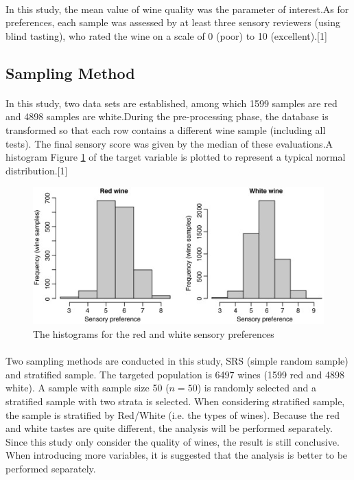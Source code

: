 \documentclass{article}
\begin{document}
\paragraph{}
In this study, the mean value of wine quality was the parameter of interest.As for preferences, each sample was assessed by at least three sensory reviewers (using blind tasting), who rated the wine on a scale of 0 (poor) to 10 (excellent).[1]
\subsection{Sampling Method}
\paragraph{}
In this study, two data sets are established, among which 1599 samples are red and 4898 samples are white.During the pre-processing phase, the database is transformed so that each row contains a different wine sample (including all tests). The final sensory score was given by the median of these evaluations.A histogram Figure \ref{figure:1} of the target variable is plotted to represent a typical normal distribution.[1]
\begin{figure}[h]
    \includegraphics[width=\textwidth]{1.jpg}
    \caption{The histograms for the red and white sensory preferences}
    \label{figure:1}
\end{figure}
\paragraph{}
Two sampling methods are conducted in this study, SRS (simple random sample) and stratified sample. The targeted population is 6497 wines (1599 red and 4898 white). A sample with sample size 50 ($ n = 50 $) is randomly selected and a stratified sample with two strata is selected. When considering stratified sample, the sample is stratified by Red/White (i.e. the types of wines). Because the red and white tastes are quite different, the analysis will be performed separately. Since this study only consider the quality of wines, the result is still conclusive. When introducing more variables, it is suggested that the analysis is better to be performed separately.
\end{document}
